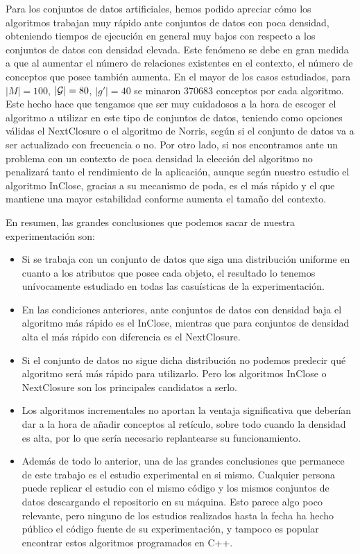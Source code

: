 \documentclass[oneside,openright,titlepage,numbers=noenddot,openany,headinclude,footinclude=true,
cleardoublepage=empty,abstractoff,BCOR=5mm,paper=a4,fontsize=12pt,main=spanish]{scrreprt}
\begin{document}
Para los conjuntos de datos artificiales, hemos podido apreciar cómo los algoritmos trabajan muy rápido ante conjuntos de datos con poca densidad, obteniendo tiempos de ejecución en general muy bajos con respecto a los conjuntos de datos con densidad elevada. Este fenómeno se debe en gran medida a que al aumentar el número de relaciones existentes en el contexto, el número de conceptos que posee también aumenta. En el mayor de los casos estudiados, para $|M|=100$, $|\mathcal{G}|=80$, $|g'|=40$ se minaron $370683$ conceptos por cada algoritmo. Este hecho hace que tengamos que ser muy cuidadosos a la hora de escoger el algoritmo a utilizar en este tipo de conjuntos de datos, teniendo como opciones válidas el NextClosure o el algoritmo de Norris, según si el conjunto de datos va a ser actualizado con frecuencia o no. Por otro lado, si nos encontramos ante un problema con un contexto de poca densidad la elección del algoritmo no penalizará tanto el rendimiento de la aplicación, aunque según nuestro estudio el algoritmo InClose, gracias a su mecanismo de poda, es el más rápido y el que mantiene una mayor estabilidad conforme aumenta el tamaño del contexto.

En resumen, las grandes conclusiones que podemos sacar de nuestra experimentación son:

\begin{itemize}
    \item Si se trabaja con un conjunto de datos que siga una distribución uniforme en cuanto a los atributos que posee cada objeto, el resultado lo tenemos unívocamente estudiado en todas las casuísticas de la experimentación.
    \item En las condiciones anteriores, ante conjuntos de datos con densidad baja el algoritmo más rápido es el InClose, mientras que para conjuntos de densidad alta el más rápido con diferencia es el NextClosure.
    \item Si el conjunto de datos no sigue dicha distribución no podemos predecir qué algoritmo será más rápido para utilizarlo. Pero los algoritmos InClose o NextClosure son los principales candidatos a serlo.
    \item Los algoritmos incrementales no aportan la ventaja significativa que deberían dar a la hora de añadir conceptos al retículo, sobre todo cuando la densidad es alta, por lo que sería necesario replantearse su funcionamiento.
    \item Además de todo lo anterior, una de las grandes conclusiones que permanece de este trabajo es el estudio experimental en si mismo. Cualquier persona puede replicar el estudio con el mismo código y los mismos conjuntos de datos descargando el repositorio en su máquina. Esto parece algo poco relevante, pero ninguno de los estudios realizados hasta la fecha ha hecho público el código fuente de su experimentación, y tampoco es popular encontrar estos algoritmos programados en C++.
\end{itemize}
\end{document}
